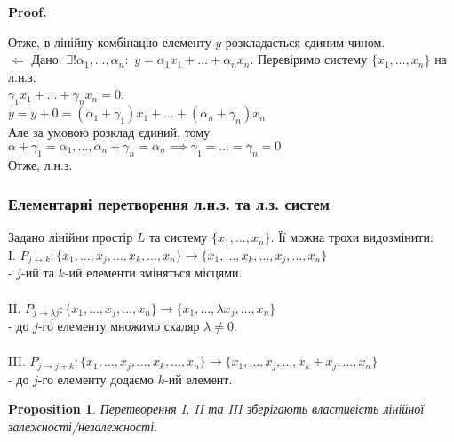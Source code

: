 \documentclass[a4paper, 10pt]{article}
\makeatletter
\def\qed{$\blacksquare$}
\def\leftproof{$\boxed{\Leftarrow}$ }
\theoremstyle{theoremdd}
\theoremstyle{theoremdd}
\theoremstyle{theoremdd}
\theoremstyle{theoremdd}
\theoremstyle{theoremdd}
\newtheorem{proposition}[theorem]{Proposition}
\theoremstyle{theoremdd}
\theoremstyle{theoremdd}
\theoremstyle{theoremdd}
\renewenvironment{proof}[1][Proof.\\]{\par
\pushQED{\hfill \qed}%
\normalfont \topsep6\p@\@plus6\p@\relax
\trivlist
\item\relax
{\bfseries
#1\@addpunct{.}}\hspace\labelsep\ignorespaces
}{%
\popQED\endtrivlist\@endpefalse
}
\makeatother
\begin{document}
\begin{proof}
	Отже, в лінійну комбінацію елементу $y$ розкладається єдиним чином.
	\bigskip \\
	\leftproof Дано: $\exists! \alpha_1, \dots, \alpha_n:$
	$y = \alpha_1 x_1 + \dots + \alpha_n x_n$. Перевіримо систему $\{x_1, \dots, x_n\}$ на л.н.з.\\
	$\gamma_1 x_1 + \dots + \gamma_n x_n = 0$.\\
	$y = y + 0 = (\alpha_1 + \gamma_1)x_1 + \dots + (\alpha_n + \gamma_n)x_n$\\
	Але за умовою розклад єдиний, тому $\alpha + \gamma_1 = \alpha_1, \dots, \alpha_n + \gamma_n = \alpha_n \implies \gamma_1 = \dots = \gamma_n = 0$\\
	Отже, л.н.з.
	\end{proof}
	
	\subsubsection*{Елементарні перетворення л.н.з. та л.з. систем}
	Задано лінійни простір $L$ та систему $\{x_1, \dots, x_n\}$. Її можна трохи видозмінити:\\
	I. $P_{j \leftrightarrow k}: \{x_1, \dots, x_j, \dots, x_k, \dots, x_n\} \rightarrow \{x_1, \dots, x_k, \dots, x_j, \dots, x_n\}$ \\ - $j$-ий та $k$-ий елементи зміняться місцями.\\
	\\
	II. $P_{j \to \lambda j}: \{x_1, \dots, x_j, \dots, x_n\} \rightarrow \{x_1, \dots, \lambda x_j, \dots, x_n\}$ \\ - до $j$-го елементу множимо скаляр $\lambda \neq 0$.\\
	\\
	III. $P_{j \to j+k}: \{x_1, \dots, x_j, \dots, x_k, \dots, x_n\} \rightarrow \{x_1, \dots, x_j, \dots,  x_k + x_j, \dots, x_n\}$ \\ - до $j$-го елементу додаємо $k$-ий елемент.
	
	\begin{proposition}
	Перетворення I, II та III зберігають властивість лінійної залежності/незалежності.
	\end{proposition}
	
\end{document}
